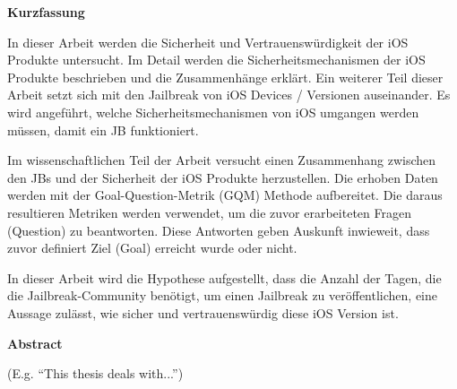 %
%
% 
% 
% 



\cleardoublepage

\begin{center}
{\Large\bfseries Kurzfassung}
\end{center}
In dieser Arbeit werden die Sicherheit und Vertrauenswürdigkeit der iOS Produkte untersucht. Im Detail werden die Sicherheitsmechanismen der iOS Produkte beschrieben und die Zusammenhänge erklärt. Ein weiterer Teil dieser Arbeit setzt sich mit den Jailbreak von iOS Devices / Versionen auseinander. Es wird angeführt, welche Sicherheitsmechanismen von iOS umgangen werden müssen, damit ein JB funktioniert. \par 
Im wissenschaftlichen Teil der Arbeit versucht einen Zusammenhang zwischen den JBs und der Sicherheit der iOS Produkte herzustellen. Die erhoben Daten werden mit der Goal-Question-Metrik (GQM) Methode aufbereitet. Die daraus resultieren Metriken werden verwendet, um die zuvor erarbeiteten Fragen (Question) zu beantworten. Diese Antworten geben Auskunft inwieweit, dass zuvor definiert Ziel (Goal) erreicht wurde oder nicht. \par 
In dieser Arbeit wird die Hypothese aufgestellt, dass die Anzahl der Tagen, die die Jailbreak-Community benötigt, um einen Jailbreak zu veröffentlichen, eine Aussage zulässt, wie sicher und vertrauenswürdig diese iOS Version ist.


\cleardoublepage


\begin{center}
{\Large\bfseries Abstract}
\end{center}

(E.g. ``This thesis deals with...'')

